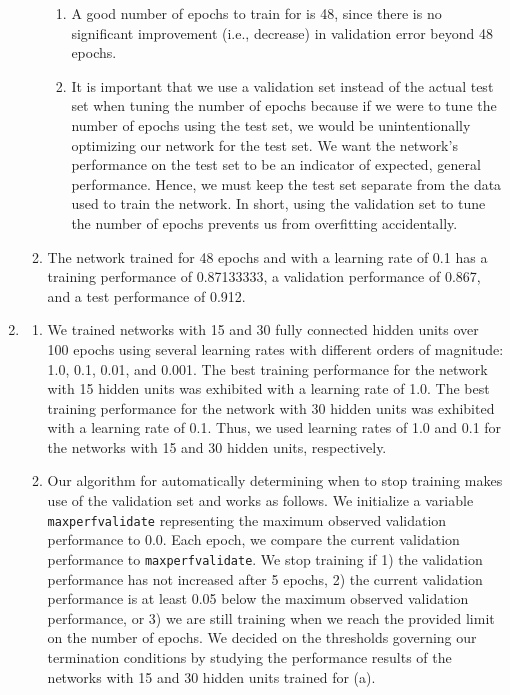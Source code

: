 \documentclass[solution, letterpaper]{cs121}
\begin{document}
\begin{enumerate}
\begin{enumerate}
\begin{enumerate}
				\item A good number of epochs to train for is 48, since there is no significant improvement (i.e., decrease) in validation error beyond 48 epochs.
				\item It is important that we use a validation set instead of the actual test set when tuning the number of epochs because if we were to tune the number of epochs using the test set, we would be unintentionally optimizing our network for the test set. We want the network's performance on the test set to be an indicator of expected, general performance. Hence, we must keep the test set separate from the data used to train the network. In short, using the validation set to tune the number of epochs prevents us from overfitting accidentally.
			\end{enumerate}
		\item The network trained for 48 epochs and with a learning rate of 0.1 has a training performance of 0.87133333, a validation performance of 0.867, and a test performance of 0.912.
		\end{enumerate}
	\item
		\begin{enumerate}
			\item We trained networks with 15 and 30 fully connected hidden units over 100 epochs using several learning rates with different orders of magnitude: 1.0, 0.1, 0.01, and 0.001. The best training performance for the network with 15 hidden units was exhibited with a learning rate of 1.0. The best training performance for the network with 30 hidden units was exhibited with a learning rate of 0.1. Thus, we used learning rates of 1.0 and 0.1 for the networks with 15 and 30 hidden units, respectively.
			\item Our algorithm for automatically determining when to stop training makes use of the validation set and works as follows. We initialize a variable {\tt max\textunderscore perf\textunderscore validate} representing the maximum observed validation performance to 0.0. Each epoch, we compare the current validation performance to {\tt max\textunderscore perf\textunderscore validate}. We stop training if 1) the validation performance has not increased after 5 epochs, 2) the current validation performance is at least 0.05 below the maximum observed validation performance, or 3) we are still training when we reach the provided limit on the number of epochs. We decided on the thresholds governing our termination conditions by studying the performance results of the networks with 15 and 30 hidden units trained for (a).

\end{enumerate}
\end{enumerate}
\end{document}
